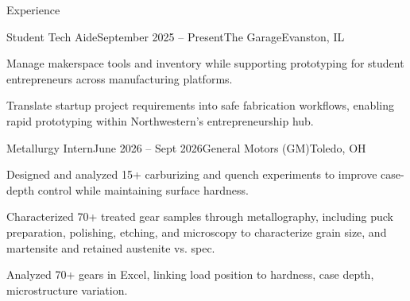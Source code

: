 \documentclass[
    a4paper,
    9pt,
]{resume}
\begin{document}
\begin{rSection}{Experience}

\begin{rSubsection}{Student Tech Aide}{September 2025 -- Present}{The Garage}{Evanston, IL}
    \item Manage makerspace tools and inventory while supporting prototyping for student entrepreneurs across manufacturing platforms.
    \item Translate startup project requirements into safe fabrication workflows, enabling rapid prototyping within Northwestern’s entrepreneurship hub.

\end{rSubsection}

\begin{rSubsection}{Metallurgy Intern}{June 2026 -- Sept 2026}{General Motors (GM)}{Toledo, OH}
    \item  Designed and analyzed 15+ carburizing and quench experiments to improve case-depth control while maintaining surface hardness.
    \item  Characterized 70+ treated gear samples through metallography, including puck preparation, polishing, etching, and microscopy to characterize grain size, and martensite and retained austenite vs. spec.
    \item Analyzed 70+ gears in Excel, linking load position to hardness, case depth, microstructure variation.
\end{rSubsection}



\end{rSection}
\end{document}
